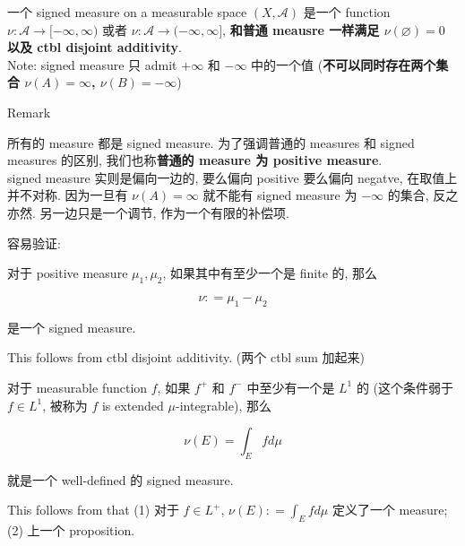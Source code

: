 \begin{definition}{}

一个 signed measure on a measurable space \((X,\mathcal{A})\) 是一个 function \(\nu:\mathcal{A}\rightarrow\lbrack - \infty,\infty)\) 或者 \(\nu:\mathcal{A}\rightarrow( - \infty,\infty\rbrack\), \textbf{和普通 meausre 一样满足 \(\nu(\varnothing) = 0\) 以及 ctbl disjoint additivity}.\\
Note: signed measure 只 admit \(+ \infty\) 和 \(- \infty\) 中的一个值 (\textbf{不可以同时存在两个集合 \(\nu(A) = \infty\), \(\nu(B) = - \infty\)})

\end{definition}

\begin{qlremark}{Remark}

所有的 measure 都是 signed measure. 为了强调普通的 measures 和 signed measures 的区别, 我们也称\textbf{普通的 measure 为 positive measure}.\\
signed measure 实则是偏向一边的, 要么偏向 positive 要么偏向 negatve, 在取值上并不对称. 因为一旦有 \(\nu(A) = \infty\) 就不能有 signed measure 为 \(- \infty\) 的集合, 反之亦然. 另一边只是一个调节, 作为一个有限的补偿项.

\end{qlremark}

\begin{example}

容易验证:

\begin{proposition}

对于 positive measure \(\mu_{1},\mu_{2}\), 如果其中有至少一个是 finite 的, 那么

\[\nu: = \mu_{1} - \mu_{2}\]

是一个 signed measure.

\end{proposition}

This follows from ctbl disjoint additivity. (两个 ctbl sum 加起来)

\end{example}

\begin{example}

\begin{proposition}

对于 measurable function \(f\), 如果 \(f^{+}\) 和 \(f^{-}\) 中至少有一个是 \(L^{1}\) 的 (这个条件弱于 \(f \in L^{1}\), 被称为 \(f\) is extended \(\mu\)-integrable), 那么

\[\nu(E) = \int_{E}f d\mu\]

就是一个 well-defined 的 signed measure.

\end{proposition}

This follows from that (1) 对于 \(f \in L^{+}\), \(\nu(E): = \int_{E}f d\mu\) 定义了一个 measure; (2) 上一个 proposition.

\end{example}

